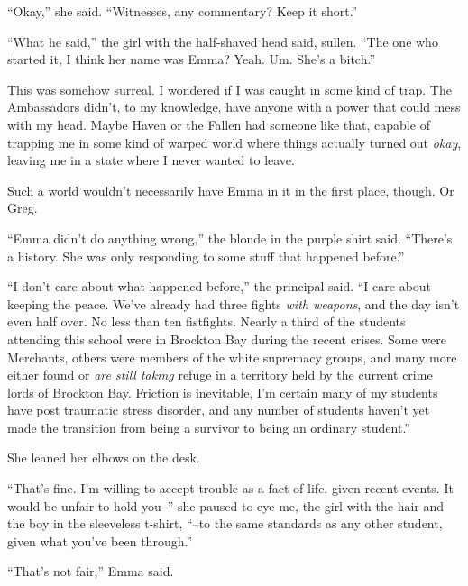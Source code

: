 ``Okay,'' she said.  ``Witnesses, any commentary?  Keep it short.''



``What he said,'' the girl with the half-shaved head said, sullen.  ``The one who started it, I think her name was Emma?  Yeah.  Um.  She's a bitch.''



This was somehow surreal.  I wondered if I was caught in some kind of trap.  The Ambassadors didn't, to my knowledge, have anyone with a power that could mess with my head.  Maybe Haven or the Fallen had someone like that, capable of trapping me in some kind of warped world where things actually turned out \emph{okay}, leaving me in a state where I never wanted to leave.



Such a world wouldn't necessarily have Emma in it in the first place, though.  Or Greg.



``Emma didn't do anything wrong,'' the blonde in the purple shirt said.  ``There's a history.  She was only responding to some stuff that happened before.''



``I don't care about what happened before,'' the principal said.  ``I care about keeping the peace.  We've already had three fights \emph{with weapons}, and the day isn't even half over.  No less than ten fistfights.  Nearly a third of the students attending this school were in Brockton Bay during the recent crises.  Some were Merchants, others were members of the white supremacy groups, and many more either found or \emph{are still taking} refuge in a territory held by the current crime lords of Brockton Bay.  Friction is inevitable, I'm certain many of my students have post traumatic stress disorder, and any number of students haven't yet made the transition from being a survivor to being an ordinary student.''



She leaned her elbows on the desk.



``That's fine.  I'm willing to accept trouble as a fact of life, given recent events.  It would be unfair to hold you--'' she paused to eye me, the girl with the hair and the boy in the sleeveless t-shirt, ``--to the same standards as any other student, given what you've been through.''



``That's not fair,'' Emma said.



